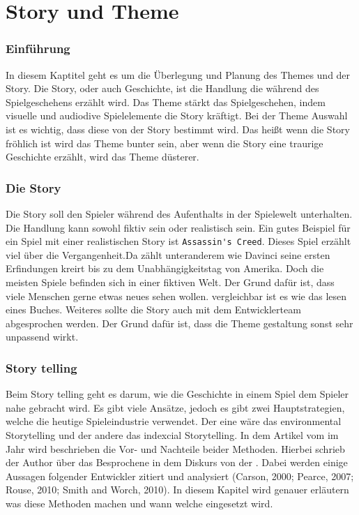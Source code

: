 \pagebreak
{}
\chapter {Story und Theme}

\subsection{Einführung}
In diesem Kaptitel geht es um die Überlegung und Planung des Themes und der Story. Die Story, oder auch Geschichte, ist die Handlung die während des Spielgeschehens erzählt wird. Das Theme stärkt das Spielgeschehen, indem visuelle und audiodive Spielelemente die Story kräftigt. Bei der Theme Auswahl ist es wichtig, dass diese von der Story bestimmt wird. Das heißt wenn die Story fröhlich ist wird das Theme bunter sein, aber wenn die Story eine traurige Geschichte erzählt, wird das Theme düsterer. 

\subsection{Die Story}
Die Story soll den Spieler während des Aufenthalts in der Spielewelt unterhalten. Die Handlung kann sowohl fiktiv sein oder realistisch sein. Ein gutes Beispiel für ein Spiel mit einer realistischen Story ist \verb+Assassin's Creed+. Dieses Spiel erzählt viel über die Vergangenheit.Da zählt unteranderem  wie Davinci seine ersten Erfindungen kreirt bis zu dem Unabhängigkeitstag von Amerika. Doch die meisten Spiele befinden sich in einer fiktiven Welt. Der Grund dafür ist, dass viele Menschen gerne etwas neues sehen wollen. vergleichbar ist es wie das lesen eines Buches. Weiteres sollte die Story auch mit dem Entwicklerteam abgesprochen werden. Der Grund dafür ist, dass die Theme gestaltung sonst sehr unpassend wirkt. 



\subsection{Story telling}

Beim Story telling geht es darum, wie die Geschichte in einem Spiel dem Spieler nahe gebracht wird. Es gibt viele Ansätze, jedoch es gibt zwei Hauptstrategien, welche die heutige Spieleindustrie verwendet. Der eine wäre das environmental Storytelling und der andere das indexcial Storytelling. In dem Artikel  vom \citeauthor{Fernadez1} im Jahr \citeyear{Fernadez1} wird beschrieben die Vor- und Nachteile beider Methoden. Hierbei schrieb der Author \citeauthor{Fernadez1} über das Besprochene in dem Diskurs von der . Dabei werden einige Aussagen folgender Entwickler zitiert und analysiert (Carson, 2000; Pearce, 2007; Rouse, 2010; Smith and Worch, 2010). In diesem Kapitel wird genauer erläutern was diese Methoden machen und wann welche eingesetzt wird. 

